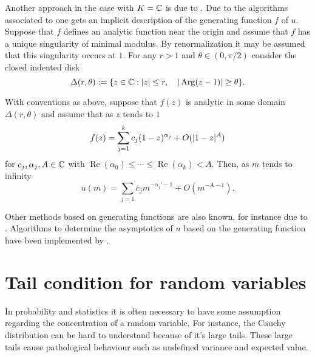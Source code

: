     Another approach in the case with $K = \mathbb{C}$ is due to \cite{flajolet1990singularity}.
    Due to the algorithms associated to  one gets an implicit description of the generating function $f$ of $u$.
    Suppose that $f$ defines an analytic function near the origin and assume that $f$ has a unique singularity of minimal modulus.
    By renormalization it may be assumed that this singularity occurs at $1$.
    For any $r>1$ and $\theta \in (0,\pi/2)$  consider the closed indented disk
    $$\Delta(r,\theta) := \{z\in \mathbb{C}: \vert z \vert\leq r, \quad \vert \operatorname{Arg}(z-1) \vert\geq \theta\}.$$
    \begin{theorem}{\cite[Corollary 3]{flajolet1990singularity}}
      With conventions as above, suppose that $f(z)$ is analytic in some domain $\Delta(r,\theta)$ and assume that as $z$ tends to $1$
      $$f(z) = \sum_{j=1}^k c_{j}(1-z)^{\alpha_j} + O(\vert 1-z \vert^A)$$
      for $c_j,\alpha_j,A\in \mathbb{C}$ with $\operatorname{Re}(\alpha_0)\leq \cdots \leq \operatorname{Re}(\alpha_k)<A$.
      Then, as $m$ tends to infinity
      $$u(m) = \sum_{j=1}c_j m^{-\alpha_j' - 1} + O(m^{-A -1}).$$
    \end{theorem}
    Other methods based on generating functions are also known, for instance due to \cite{hayman1956generalisation}.
    Algorithms to determine the asymptotics of $u$ based on the generating function have been implemented by \cite{salvy1991examples}.
\section{Tail condition for random variables}\label{sec: SubGSubE}
In probability and statistics it is often necessary to have some assumption regarding the concentration of a random variable.
For instance, the Cauchy distribution can be hard to understand because of it's large tails.
These large tails cause pathological behaviour such as undefined variance and expected value.

